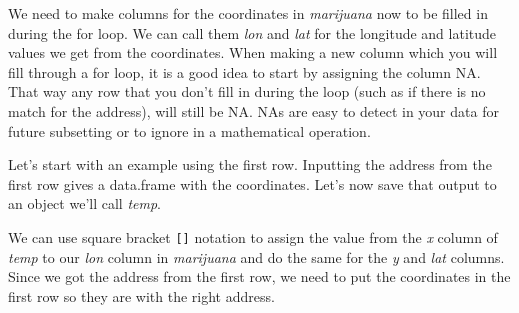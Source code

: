 \documentclass[
  12pt,
  openany]{book}
\newenvironment{Shaded}{\begin{snugshade}}{\end{snugshade}}
\newcommand{\CommentTok}[1]{\textcolor[rgb]{0.37,0.37,0.37}{\textit{#1}}}
\newcommand{\ConstantTok}[1]{\textcolor[rgb]{0,0,0}{#1}}
\newcommand{\DecValTok}[1]{\textcolor[rgb]{0.06,0.06,0.06}{#1}}
\newcommand{\FunctionTok}[1]{\textcolor[rgb]{0,0,0}{#1}}
\newcommand{\NormalTok}[1]{#1}
\newcommand{\OtherTok}[1]{\textcolor[rgb]{0.37,0.37,0.37}{#1}}
\newcommand{\SpecialCharTok}[1]{\textcolor[rgb]{0,0,0}{#1}}
\begin{document}
We need to make columns for the coordinates in \emph{marijuana} now to be filled in during the for loop. We can call them \emph{lon} and \emph{lat} for the longitude and latitude values we get from the coordinates. When making a new column which you will fill through a for loop, it is a good idea to start by assigning the column NA. That way any row that you don't fill in during the loop (such as if there is no match for the address), will still be NA. NAs are easy to detect in your data for future subsetting or to ignore in a mathematical operation.

\begin{Shaded}
\end{Shaded}

Let's start with an example using the first row. Inputting the address from the first row gives a data.frame with the coordinates. Let's now save that output to an object we'll call \emph{temp}.

\begin{Shaded}
\end{Shaded}

We can use square bracket \texttt{{[}{]}} notation to assign the value from the \emph{x} column of \emph{temp} to our \emph{lon} column in \emph{marijuana} and do the same for the \emph{y} and \emph{lat} columns. Since we got the address from the first row, we need to put the coordinates in the first row so they are with the right address.

\begin{Shaded}
\end{Shaded}
\end{document}
